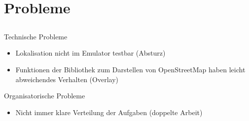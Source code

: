 \documentclass[hyperref]{beamer}
\begin{document}
\section{Probleme}
\subsection{}

\begin{frame}{Technische Probleme}
\begin{itemize}
\item Lokalisation nicht im Emulator testbar (Absturz)
\item Funktionen der Bibliothek zum Darstellen von OpenStreetMap haben leicht abweichendes Verhalten (Overlay)
\end{itemize}
\end{frame}

\begin{frame}{Organisatorische Probleme}
\begin{itemize}
\item Nicht immer klare Verteilung der Aufgaben (doppelte Arbeit)
\end{itemize}
\end{frame}
\end{document}

